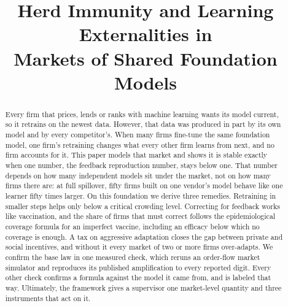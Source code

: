 \documentclass[conference]{IEEEtran}
\theoremstyle{plain}
\begin{document}
\title{Herd Immunity and Learning Externalities in\\ Markets of Shared Foundation Models}

\author{%
\and
{}
}

\makeatletter
\def\ps@IEEEtitlepagestyle{%
  \def\@oddhead{}\def\@evenhead{}%
  \def\@oddfoot{\hfil\footnotesize 979-8-XXXX-XXXX-X/26/\$31.00~\copyright2026 IEEE\hfil}%
  \let\@evenfoot\@oddfoot}
\makeatother

\maketitle

\begin{abstract}
Every firm that prices, lends or ranks with machine learning wants its model current, so it retrains on the newest data. However, that data was produced in part by its own model and by every competitor's. When many firms fine-tune the same foundation model, one firm's retraining changes what every other firm learns from next, and no firm accounts for it. This paper models that market and shows it is stable exactly when one number, the feedback reproduction number, stays below one. That number depends on how many independent models sit under the market, not on how many firms there are: at full spillover, fifty firms built on one vendor's model behave like one learner fifty times larger. On this foundation we derive three remedies. Retraining in smaller steps helps only below a critical crowding level. Correcting for feedback works like vaccination, and the share of firms that must correct follows the epidemiological coverage formula for an imperfect vaccine, including an efficacy below which no coverage is enough. A tax on aggressive adaptation closes the gap between private and social incentives, and without it every market of two or more firms over-adapts. We confirm the base law in one measured check, which reruns an order-flow market simulator and reproduces its published amplification to every reported digit. Every other check confirms a formula against the model it came from, and is labeled that way. Ultimately, the framework gives a supervisor one market-level quantity and three instruments that act on it.
\end{abstract}
\end{document}
